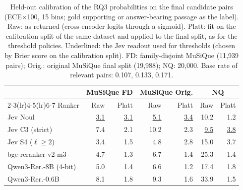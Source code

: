 \begin{table}[tp]
\centering
\scriptsize
\setlength{\tabcolsep}{2.4pt}
\caption{Held-out calibration of the RQ3 probabilities on the final candidate pairs (ECE$\times$100, 15 bins; gold supporting or answer-bearing passage as the label). Raw: as returned (cross-encoder logits through a sigmoid). Platt: fit on the calibration split of the same dataset and applied to the final split, as for the threshold policies. Underlined: the Jev readout used for thresholds (chosen by Brier score on the calibration split). FD: family-disjoint MuSiQue (11{,}939 pairs); Orig.: original MuSiQue final split (19{,}988); NQ: 20{,}000. Base rate of relevant pairs: 0.107, 0.133, 0.171.}
\label{tab:rag-calib}
\begin{tabular}{lrrrrrr}
\toprule
 & \multicolumn{2}{c}{MuSiQue FD} & \multicolumn{2}{c}{MuSiQue Orig.} & \multicolumn{2}{c}{NQ} \\
\cmidrule(lr){2-3}\cmidrule(lr){4-5}\cmidrule(lr){6-7}
Ranker & Raw & Platt & Raw & Platt & Raw & Platt \\
\midrule
Jev Noul & \underline{3.1} & \underline{3.1} & \underline{5.1} & \underline{3.4} & 10.2 & 1.2 \\
Jev C3 (strict) & 7.4 & 2.1 & 10.2 & 2.3 & \underline{9.5} & \underline{3.8} \\
Jev S4 ($\ell\ge2$) & 3.4 & 1.5 & 4.8 & 2.8 & 15.0 & 3.7 \\
bge-reranker-v2-m3 & 4.7 & 1.3 & 6.7 & 1.4 & 25.3 & 1.4 \\
Qwen3-Rer.-8B (4-bit) & 5.0 & 1.4 & 6.6 & 1.2 & 17.4 & 1.8 \\
Qwen3-Rer.-0.6B & 8.1 & 1.8 & 9.3 & 1.6 & 33.9 & 1.5 \\
\bottomrule
\end{tabular}
\end{table}
